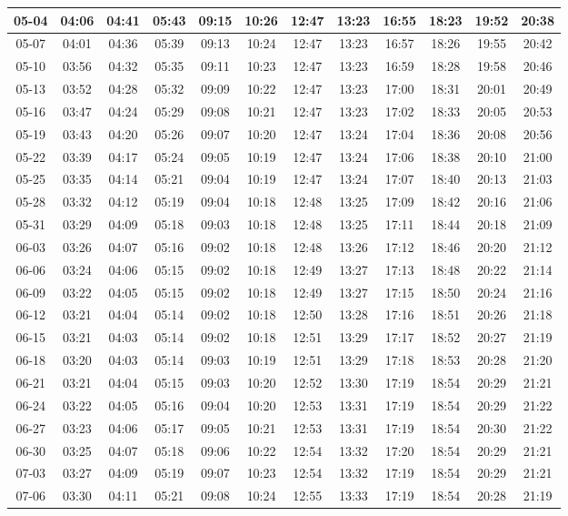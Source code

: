 \begin{footnotesize}
\begin{tabular}{c | c | c| c| c| c| c| c| c| c| c| c}
		05-04&04:06&04:41&05:43&09:15&10:26&12:47&13:23&16:55&18:23&19:52&20:38\\\hline
		05-07&04:01&04:36&05:39&09:13&10:24&12:47&13:23&16:57&18:26&19:55&20:42\\\hline
		05-10&03:56&04:32&05:35&09:11&10:23&12:47&13:23&16:59&18:28&19:58&20:46\\\hline
		05-13&03:52&04:28&05:32&09:09&10:22&12:47&13:23&17:00&18:31&20:01&20:49\\\hline
		05-16&03:47&04:24&05:29&09:08&10:21&12:47&13:23&17:02&18:33&20:05&20:53\\\hline
		05-19&03:43&04:20&05:26&09:07&10:20&12:47&13:24&17:04&18:36&20:08&20:56\\\hline
		05-22&03:39&04:17&05:24&09:05&10:19&12:47&13:24&17:06&18:38&20:10&21:00\\\hline
		05-25&03:35&04:14&05:21&09:04&10:19&12:47&13:24&17:07&18:40&20:13&21:03\\\hline
		05-28&03:32&04:12&05:19&09:04&10:18&12:48&13:25&17:09&18:42&20:16&21:06\\\hline
		05-31&03:29&04:09&05:18&09:03&10:18&12:48&13:25&17:11&18:44&20:18&21:09\\\hline
		06-03&03:26&04:07&05:16&09:02&10:18&12:48&13:26&17:12&18:46&20:20&21:12\\\hline
		06-06&03:24&04:06&05:15&09:02&10:18&12:49&13:27&17:13&18:48&20:22&21:14\\\hline
		06-09&03:22&04:05&05:15&09:02&10:18&12:49&13:27&17:15&18:50&20:24&21:16\\\hline
		06-12&03:21&04:04&05:14&09:02&10:18&12:50&13:28&17:16&18:51&20:26&21:18\\\hline
		06-15&03:21&04:03&05:14&09:02&10:18&12:51&13:29&17:17&18:52&20:27&21:19\\\hline
		06-18&03:20&04:03&05:14&09:03&10:19&12:51&13:29&17:18&18:53&20:28&21:20\\\hline
		06-21&03:21&04:04&05:15&09:03&10:20&12:52&13:30&17:19&18:54&20:29&21:21\\\hline
		06-24&03:22&04:05&05:16&09:04&10:20&12:53&13:31&17:19&18:54&20:29&21:22\\\hline
		06-27&03:23&04:06&05:17&09:05&10:21&12:53&13:31&17:19&18:54&20:30&21:22\\\hline
		06-30&03:25&04:07&05:18&09:06&10:22&12:54&13:32&17:20&18:54&20:29&21:21\\\hline
		07-03&03:27&04:09&05:19&09:07&10:23&12:54&13:32&17:19&18:54&20:29&21:21\\\hline
		07-06&03:30&04:11&05:21&09:08&10:24&12:55&13:33&17:19&18:54&20:28&21:19\\\hline

\end{tabular}
\end{footnotesize}
